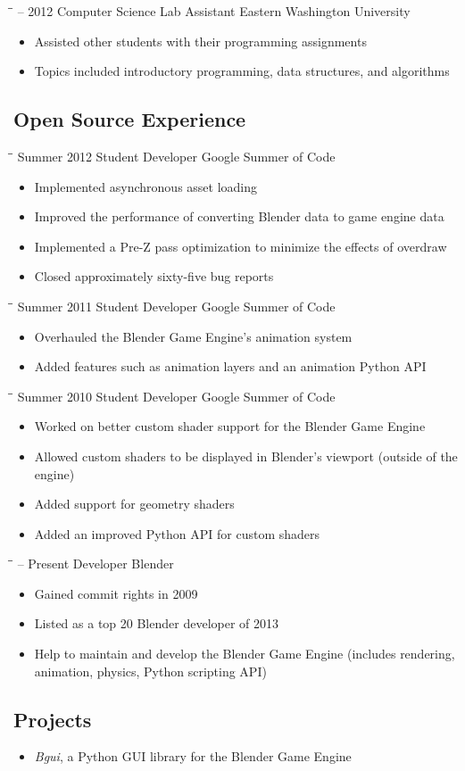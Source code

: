 \documentclass[]{ewucsthesis}
\newenvironment{experience}[4]
{
  \begin{tabbing}
  \hspace{1.4in}\= \hspace{2.2in}\= \kill %
		#1 \> #2 \> #3  \\
  \end{tabbing}\vspace{-15pt}      %
  \begin{itemize}
}
{
  \end{itemize}
}
\begin{document}
   \begin{experience}{2010 -- 2012}{Computer Science Lab Assistant}{Eastern Washington University}{Cheney, WA}
    \item Assisted other students with their programming assignments
    \item Topics included introductory programming, data structures, and algorithms
   \end{experience}

\subsection*{Open Source Experience}
   \vspace{-0.1in}

   \begin{experience}{Summer 2012}{Student Developer}{Google Summer of Code}{}
    \item Implemented asynchronous asset loading
    \item Improved the performance of converting Blender data to game engine data
    \item Implemented a Pre-Z pass optimization to minimize the effects of overdraw
    \item Closed approximately sixty-five bug reports
   \end{experience}

   \begin{experience}{Summer 2011}{Student Developer}{Google Summer of Code}{}
    \item Overhauled the Blender Game Engine's animation system
    \item Added features such as animation layers and an animation Python API
   \end{experience}

   \begin{experience}{Summer 2010}{Student Developer}{Google Summer of Code}{}
    \item Worked on better custom shader support for the Blender Game Engine
    \item Allowed custom shaders to be displayed in Blender's viewport (outside of the engine)
    \item Added support for geometry shaders
    \item Added an improved Python API for custom shaders
   \end{experience}

   \begin{experience}{2008 -- Present}{Developer}{Blender}{}
    \item Gained commit rights in 2009
    \item Listed as a top 20 Blender developer of 2013
    \item Help to maintain and develop the Blender Game Engine (includes rendering, animation, physics, Python scripting API)
   \end{experience}

\subsection*{Projects}
   \begin{itemize}
    \item {\em Bgui}, a Python GUI library for the Blender Game Engine
   \end{itemize}
\end{document}
